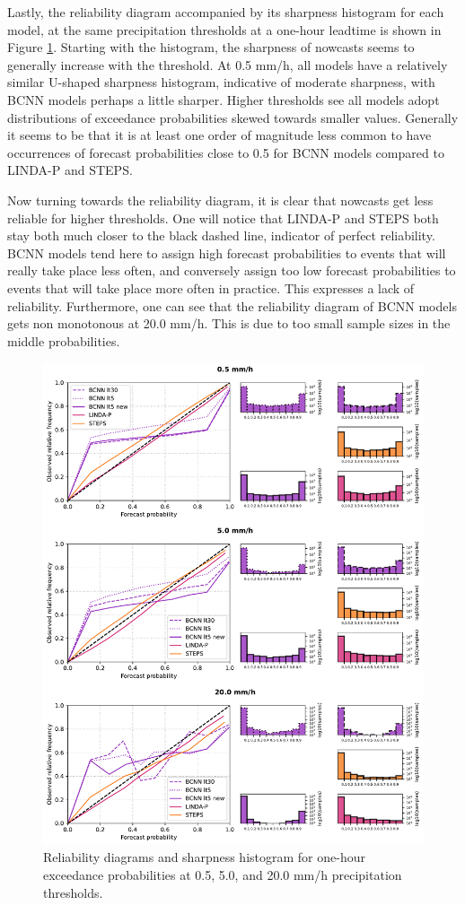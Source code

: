 Lastly, the reliability diagram accompanied by its sharpness histogram for each model, at the same precipitation thresholds at a one-hour leadtime is shown in Figure \ref{fig:reldiag}. Starting with the histogram, the sharpness of nowcasts seems to generally increase with the threshold. At 0.5 mm/h, all models have a relatively similar U-shaped sharpness histogram, indicative of moderate sharpness, with BCNN models perhaps a little sharper. Higher thresholds see all models adopt distributions of exceedance probabilities skewed towards smaller values. Generally it seems to be that it is at least one order of magnitude less common to have occurrences of forecast probabilities close to 0.5 for BCNN models compared to LINDA-P and STEPS.

Now turning towards the reliability diagram, it is clear that nowcasts get less reliable for higher thresholds. One will notice that LINDA-P and STEPS both stay both much closer to the black dashed line, indicator of perfect reliability. BCNN models tend here to assign high forecast probabilities to events that will really take place less often, and conversely assign too low forecast probabilities to events that will take place more often in practice. This expresses a lack of reliability. Furthermore, one can see that the reliability diagram of BCNN models gets non monotonous at 20.0 mm/h. This is due to too small sample sizes in the middle probabilities.

 
 \begin{figure}[H]
 	\includegraphics[width=0.95\linewidth]{images/metrics/RELDIAG_together}
 	\caption{Reliability diagrams and sharpness histogram for one-hour exceedance probabilities at 0.5, 5.0, and 20.0 mm/h precipitation thresholds.}
 	\label{fig:reldiag}
 \end{figure}
